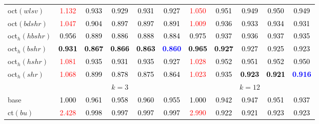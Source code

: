\begin{tabular}[t]{l|>{}cccc>{}c|ccccc}
oct$(wlsv)$ & \textcolor{red}{1.132} & \textcolor{black}{0.933} & \textcolor{black}{0.929} & \textcolor{black}{0.931} & \textcolor{black}{0.927} & \textcolor{red}{1.050} & \textcolor{black}{0.951} & \textcolor{black}{0.949} & \textcolor{black}{0.950} & \textcolor{black}{0.949}\\
oct$(bdshr)$ & \textcolor{red}{1.047} & \textcolor{black}{0.904} & \textcolor{black}{0.897} & \textcolor{black}{0.897} & \textcolor{black}{0.891} & \textcolor{red}{1.009} & \textcolor{black}{0.936} & \textcolor{black}{0.933} & \textcolor{black}{0.934} & \textcolor{black}{0.931}\\
oct$_h(hbshr)$ & \textcolor{black}{0.956} & \textcolor{black}{0.889} & \textcolor{black}{0.886} & \textcolor{black}{0.888} & \textcolor{black}{0.884} & \textcolor{black}{0.975} & \textcolor{black}{0.937} & \textcolor{black}{0.936} & \textcolor{black}{0.937} & \textcolor{black}{0.935}\\
oct$_h(bshr)$ & \textcolor{black}{\textbf{0.931}} & \textcolor{black}{\textbf{0.867}} & \textcolor{black}{\textbf{0.866}} & \textcolor{black}{\textbf{0.863}} & \textcolor{blue}{\textbf{0.860}} & \textcolor{black}{\textbf{0.965}} & \textcolor{black}{\textbf{0.927}} & \textcolor{black}{0.927} & \textcolor{black}{0.925} & \textcolor{black}{0.923}\\
oct$_h(hshr)$ & \textcolor{red}{1.081} & \textcolor{black}{0.935} & \textcolor{black}{0.931} & \textcolor{black}{0.935} & \textcolor{black}{0.927} & \textcolor{red}{1.028} & \textcolor{black}{0.952} & \textcolor{black}{0.951} & \textcolor{black}{0.952} & \textcolor{black}{0.950}\\
oct$_h(shr)$ & \textcolor{red}{1.068} & \textcolor{black}{0.899} & \textcolor{black}{0.878} & \textcolor{black}{0.875} & \textcolor{black}{0.864} & \textcolor{red}{1.023} & \textcolor{black}{0.935} & \textcolor{black}{\textbf{0.923}} & \textcolor{black}{\textbf{0.921}} & \textcolor{blue}{\textbf{0.916}}\\
\addlinespace[0.3em]
\multicolumn{1}{c}{} & \multicolumn{5}{c}{\textbf{$k = 3$}} & \multicolumn{5}{c}{\textbf{$k = 12$}}\\
base & \textcolor{black}{1.000} & \textcolor{black}{0.961} & \textcolor{black}{0.958} & \textcolor{black}{0.960} & \textcolor{black}{0.955} & \textcolor{black}{1.000} & \textcolor{black}{0.942} & \textcolor{black}{0.947} & \textcolor{black}{0.951} & \textcolor{black}{0.937}\\
ct$(bu)$ & \textcolor{red}{2.428} & \textcolor{black}{0.998} & \textcolor{black}{0.997} & \textcolor{black}{0.997} & \textcolor{black}{0.997} & \textcolor{red}{2.990} & \textcolor{black}{0.922} & \textcolor{black}{0.921} & \textcolor{black}{0.923} & \textcolor{black}{0.923}\\

\end{tabular}
